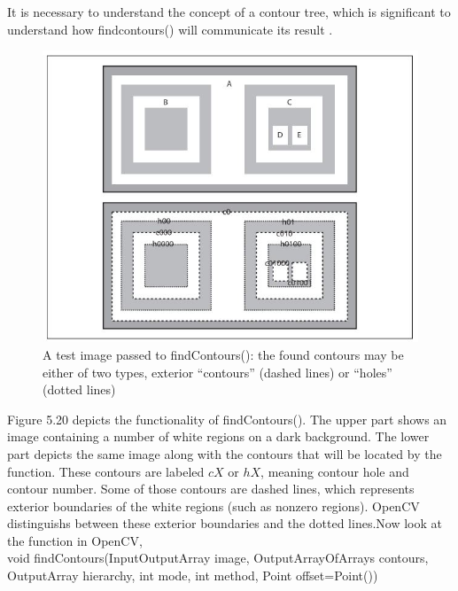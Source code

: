 It is necessary to understand the concept of a contour tree, which is significant to understand how findcontours() will communicate its result \cite{suzuki}.\\

\begin{figure}[!htb]
	\centering
	\includegraphics[scale=0.8]{img/conter}
	\caption{ A test image passed to findContours(): the found contours may be
either of two types, exterior “contours” (dashed lines) or “holes” (dotted lines)}
\end{figure}


\newpage
Figure 5.20 depicts the functionality of findContours(). The upper part shows an image containing a number of white regions on a dark background. The lower part depicts the same image along with the contours that will be located by the function. These contours are labeled $cX$ or $hX$, meaning contour hole and contour number. Some of those contours are dashed lines, which represents exterior
boundaries of the white regions (such as nonzero regions). OpenCV distinguishs between these exterior boundaries and the dotted lines\cite{Bradski}.Now look at the function in OpenCV, \\

void findContours(InputOutputArray image, OutputArrayOfArrays contours, OutputArray hierarchy, int mode, int method, Point offset=Point())\\

